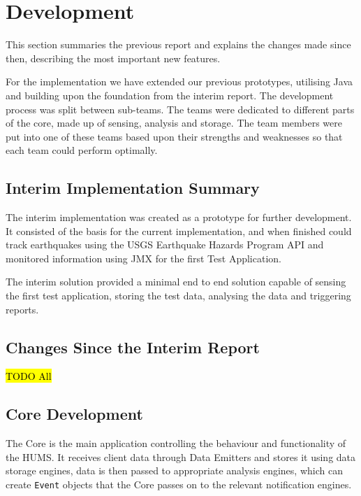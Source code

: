 \documentclass[10pt,a4paper]{article}
\begin{document}
\section{Development}
\label{sec:dev}
This section summaries the previous report and explains the changes made since then, describing the most important new features. 

For the implementation we have extended our previous prototypes, utilising Java and building upon the foundation from the interim report. The development process was split between sub-teams. The teams were dedicated to different parts of the core, made up of sensing, analysis and storage. The team members were put into one of these teams based upon their strengths and weaknesses so that each team could perform optimally. 

\subsection{Interim Implementation Summary}
\label{sec:interim_summary}
The interim implementation was created as a prototype for further development. It consisted of the basis for the current implementation, and when finished could track earthquakes using the USGS Earthquake Hazards Program API and monitored information using JMX for the first Test Application.

The interim solution provided a minimal end to end solution capable of sensing the first test application, storing the test data, analysing the data and triggering reports. 

\subsection{Changes Since the Interim Report}
\label{sec:changes}
\hl{TODO All}

\subsection{Core Development}
\label{sec:core}
 
The Core is the main application controlling the behaviour and functionality of the HUMS. It receives client data through Data Emitters and stores it using data storage engines, data is then passed to appropriate analysis engines, which can create \texttt{Event} objects that the Core passes on to the relevant notification engines.
\end{document}
